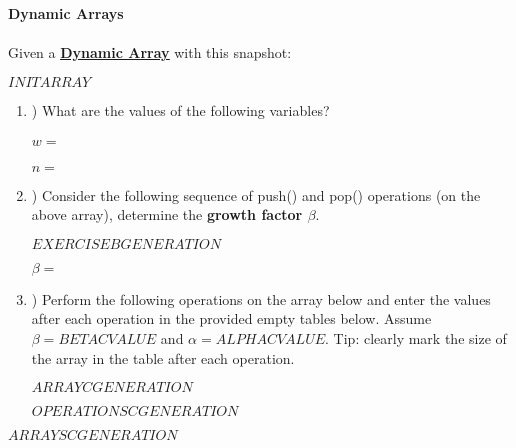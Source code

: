 \textbf{\LARGE{\color{tumgadPurple}Dynamic Arrays}}\\
\\
\noindent
Given a \href{https://sebastianoner.github.io/TUMGAD/src/DataStructures/Sequences/Arrays/Arrays}{\textbf{\underline{Dynamic Array}}} with this snapshot:
\begin{center}
    $INITARRAY$
\end{center}
\begin{enumerate}[label=\alph*]
    \item \hspace{-5px}) What are the values of the following variables?\\
    \\
    $w = $\\
    \\
    $n = $
    \\
    \item \hspace{-5px}) Consider the following sequence of push() and pop() operations (on the above array), determine the \textbf{growth factor $\beta$}.
    \begin{center}
        $EXERCISEBGENERATION$
    \end{center}
    $\beta = $\\
    \item \hspace{-5px}) Perform the following operations on the array below and enter the values after each operation in the provided empty
    tables below. Assume $\beta = BETACVALUE$ and $\alpha = ALPHACVALUE$. Tip: clearly mark the size of the array in the table after each operation.
    \begin{center}
        $ARRAYCGENERATION$
    \end{center}
    $OPERATIONSCGENERATION$
\end{enumerate}
\begin{center}
    $ARRAYSCGENERATION$
\end{center}
